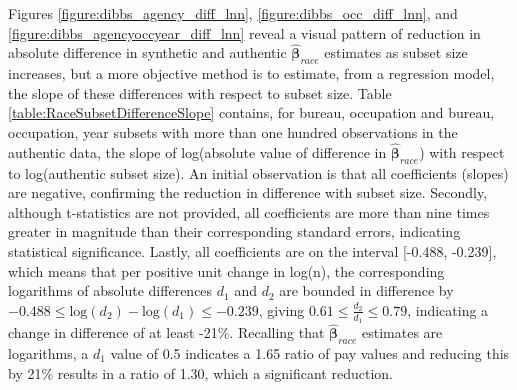 \documentclass[10pt, letterpaper]{article}
\newcommand{\mest}[1]{\hat{\bm{#1}}}
\begin{document}
\begin{spacing}{1.0}
Figures \ref{figure:dibbs_agency_diff_lnn}, \ref{figure:dibbs_occ_diff_lnn}, and \ref{figure:dibbs_agencyoccyear_diff_lnn} reveal a visual pattern of reduction in absolute difference in synthetic and authentic $\mest{\beta}_{race}$ estimates as subset size increases, but a more objective method is to estimate, from a regression model, the slope of these differences with respect to subset size.  Table \ref{table:RaceSubsetDifferenceSlope} contains, for bureau, occupation and bureau, occupation, year subsets with more than one hundred observations in the authentic data, the slope of log(absolute value of difference in $\mest{\beta}_{race}$) with respect to log(authentic subset size).  An initial observation is that all coefficients (slopes) are negative, confirming the reduction in difference with subset size.  Secondly, although t-statistics are not provided, all coefficients are more than nine times greater in magnitude than their corresponding standard errors, indicating statistical significance.  Lastly, all coefficients are on the interval [-0.488, -0.239], which means that per positive unit change in log(n), the corresponding logarithms of absolute differences $d_1$ and $d_2$ are bounded in difference by $-0.488 \le \text{log}(d_2)-\text{log}(d_1) \le -0.239$, giving $0.61 \le \frac{d_2}{d_1} \le 0.79$, indicating a change in difference of at least -21\%.  Recalling that $\mest{\beta}_{race}$ estimates are logarithms, a $d_1$ value of 0.5 indicates a 1.65 ratio of pay values and reducing this by 21\% results in a ratio of 1.30, which a significant reduction. 

\vspace{20pt}


\end{spacing}
\end{document}
